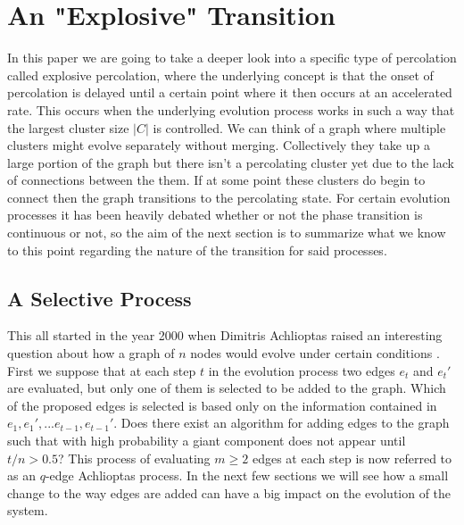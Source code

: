 \section{An "Explosive" Transition}
In this paper we are going to take a deeper look into a specific type of percolation called explosive percolation, where the underlying concept is that the onset of percolation is delayed until a certain point where it then occurs at an accelerated rate.
This occurs when the underlying evolution process works in such a way that the largest cluster size $|C|$ is controlled.
We can think of a graph where multiple clusters might evolve separately without merging.
Collectively they take up a large portion of the graph but there isn't a percolating cluster yet due to the lack of connections between the them.
If at some point these clusters do begin to connect then the graph transitions to the percolating state.
For certain evolution processes it has been heavily debated whether or not the phase transition is continuous or not, so the aim of the next section is to summarize what we know to this point regarding the nature of the transition for said processes.



\subsection{A Selective Process}
This all started in the year 2000 when Dimitris Achlioptas raised an interesting question about how a graph of $n$ nodes would evolve under certain conditions \cite{BF}.
First we suppose that at each step $t$ in the evolution process two edges $e_t$ and $e_t'$ are evaluated, but only one of them is selected to be added to the graph.
Which of the proposed edges is selected is based only on the information contained in $e_1, e_1', ... e_{t-1}, e_{t-1}'$.
Does there exist an algorithm for adding edges to the graph such that with high probability a giant component does not appear until $t/n > 0.5$?
This process of evaluating $m \ge 2$ edges at each step is now referred to as an $q$-edge Achlioptas process.
In the next few sections we will see how a small change to the way edges are added can have a big impact on the evolution of the system.



